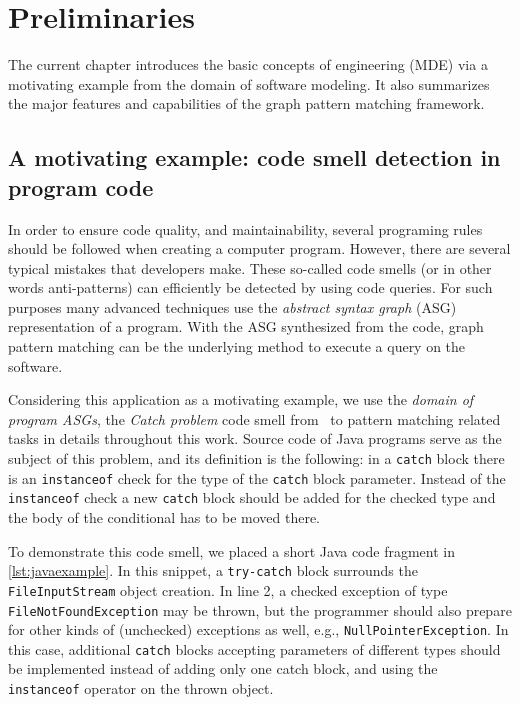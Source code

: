 \chapter{Preliminaries}\label{sect:preliminaries}
\label{chap:preliminaries}
The current chapter introduces the basic concepts of \modeldriven engineering (MDE) via a motivating example from the domain of software modeling. It also summarizes the major features and capabilities of the \eiq graph pattern matching framework.

\section{A motivating example: code smell detection in program code}
\label{sec:example}
In order to ensure code quality, and maintainability, several programing rules should be followed when creating a computer program. However, there are several typical mistakes that developers make. These so-called code smells (or in other words anti-patterns) can efficiently be detected by using code queries. For such purposes many advanced techniques use the \emph{abstract syntax graph} (ASG) representation of a program. With the ASG synthesized from the code, graph pattern matching can be the underlying method to execute a query on the software.

Considering this application as a motivating example, we use the \emph{domain of program ASGs}, the \emph{Catch problem} code smell from~\cite{DBLP:journals/infsof/UjhelyiSHCVVF15} to pattern matching related tasks in details throughout this work. Source code of Java programs serve as the subject of this problem, and its definition is the following: in a \texttt{catch} block there is an \texttt{instanceof} check for the type of the \texttt{catch} block parameter. Instead of the \texttt{instanceof} check a new \texttt{catch} block should be added for the checked type and the body of the conditional has to be moved there. 

To demonstrate this code smell, we placed a short Java code fragment in \autoref{lst:javaexample}. In this snippet, a \texttt{try-catch} block surrounds the \texttt{FileInputStream} object creation. In line 2, a checked exception of type \texttt{FileNotFoundException} may be thrown, but the programmer should also prepare for other kinds of (unchecked) exceptions as well, e.g., \texttt{NullPointerException}. In this case, additional \texttt{catch} blocks accepting parameters of different types should be implemented instead of adding only one catch block, and using the \texttt{instanceof} operator on the thrown object.
\begin{figure}[!htp]
\end{figure}


